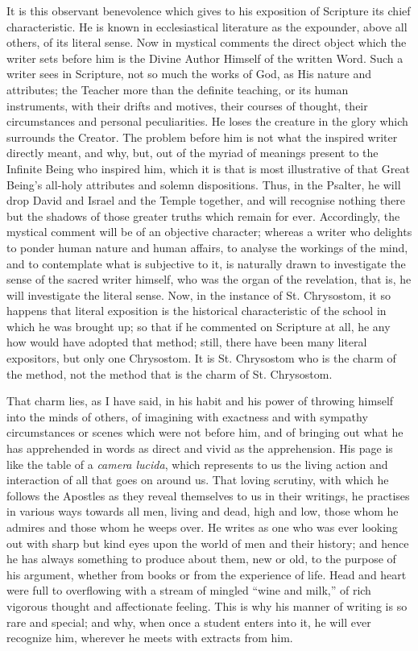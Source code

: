 It is this observant benevolence which gives to his exposition of
Scripture its chief characteristic. He is known in ecclesiastical
literature as the expounder, above all others, of its literal sense.
Now in mystical comments the direct object which the writer sets
before him is the Divine Author Himself of the written Word. Such a
writer sees in Scripture, not so much the works of God, as His nature
and attributes; the Teacher more than the definite teaching, or its
human instruments, with their drifts and motives, their courses of
thought, their circumstances and personal peculiarities. He loses the
creature in the glory which surrounds the Creator. The problem before
him is not what the inspired writer directly meant, and why, but, out
of the myriad of meanings present to the Infinite Being who inspired
him, which it is that is most illustrative of that Great Being's
all-holy attributes and solemn dispositions. Thus, in the Psalter, he
will drop David and Israel and the Temple together, and will recognise
nothing there but the shadows of those greater truths which remain for
ever. Accordingly, the mystical comment will be of an objective
character; whereas a writer who delights to ponder human nature and
human affairs, to analyse the workings of the mind, and to contemplate
what is subjective to it, is naturally drawn to investigate the sense
of the sacred writer himself, who was the organ of the revelation,
that is, he will investigate the literal sense. Now, in the instance
of St. Chrysostom, it so happens that literal exposition is the
historical characteristic of the school in which he was brought up; so
that if he commented on Scripture at all, he any how would have
adopted that method; still, there have been many literal expositors, but only one Chrysostom. It is St. Chrysostom who is the
charm of the method, not the method that is the charm of St.
Chrysostom.

That charm lies, as I have said, in his habit and his power of
throwing himself into the minds of others, of imagining with exactness
and with sympathy circumstances or scenes which were not before him,
and of bringing out what he has apprehended in words as direct and
vivid as the apprehension. His page is like the table of a \emph{camera
lucida}, which represents to us the living action and interaction
of all that goes on around us. That loving scrutiny, with which he
follows the Apostles as they reveal themselves to us in their
writings, he practises in various ways towards all men, living and
dead, high and low, those whom he admires and those whom he weeps
over. He writes as one who was ever looking out with sharp but kind
eyes upon the world of men and their history; and hence he has always
something to produce about them, new or old, to the purpose of his
argument, whether from books or from the experience of life. Head and
heart were full to overflowing with a stream of mingled ``wine and
milk,'' of rich vigorous thought and affectionate feeling. This is
why his manner of writing is so rare and special; and why, when once a
student enters into it, he will ever recognize him, wherever he meets
with extracts from him.

